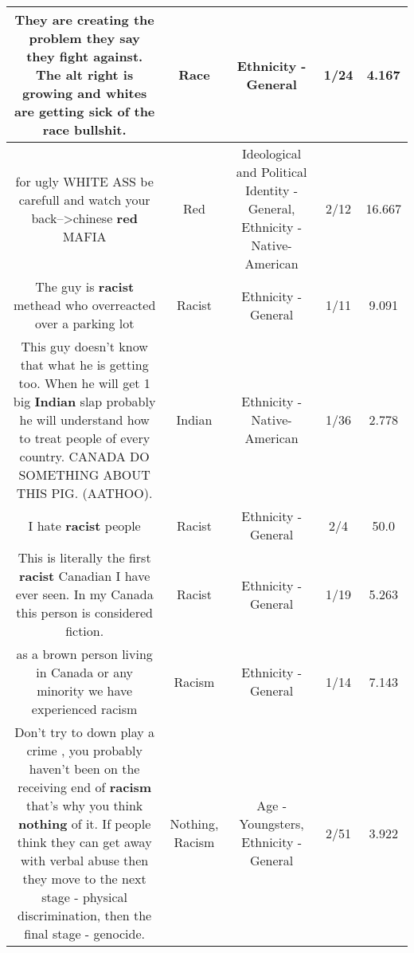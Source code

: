 \documentclass[11pt]{article}
\newlength\mylength
\begin{document}
\begin{center}
\begin{longtable}{|C{.65\mylength}|C{.30\mylength}|C{.12\mylength}|C{.12\mylength}|C{.12\mylength}|}
  \small They are creating the problem they say they fight against.  The alt right is growing and whites are getting sick of the \textbf{race} bullshit.\normalsize   & Race & Ethnicity - General & 1/24 & 4.167 \\  \hline
  \small for ugly WHITE ASS be carefull and watch your back-->chinese \textbf{r\textbf{ed}} MAFIA\normalsize   & Red &  Ideological and Political Identity - General, Ethnicity - Native-American & 2/12 & 16.667 \\  \hline
  \small The guy is \textbf{racist} methead who overreacted over a parking lot\normalsize   & Racist & Ethnicity - General & 1/11 & 9.091 \\  \hline
  \small This guy doesn't know that what he is getting too.  When he will get 1 big \textbf{Indian} slap probably he will understand how to treat people of every country.  CANADA DO SOMETHING ABOUT THIS PIG. (AATHOO).\normalsize   & Indian & Ethnicity - Native-American & 1/36 & 2.778 \\  \hline
  \small I hate \textbf{racist} people\normalsize   & Racist & Ethnicity - General & 2/4 & 50.0 \\  \hline
  \small This is literally the first \textbf{racist} Canadian I have ever seen. In my Canada this person is considered fiction.\normalsize   & Racist & Ethnicity - General & 1/19 & 5.263 \\  \hline
  \small as a brown person living in Canada or any minority we have experienced racism\normalsize   & Racism & Ethnicity - General & 1/14 & 7.143 \\  \hline
  \small Don't try to down play a crime , you probably haven't been on the receiving end of \textbf{racism} that's why you think \textbf{nothing} of it. If people think they can get away with verbal abuse then they move to the next stage - physical discrimination, then the final stage - genocide.\normalsize   & Nothing, Racism & Age - Youngsters, Ethnicity - General & 2/51 & 3.922 \\  \hline

\end{longtable}
\end{center}
\end{document}

